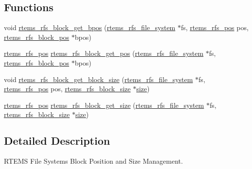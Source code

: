 \subsection*{Functions}
\begin{DoxyCompactItemize}
\item 
void \mbox{\hyperlink{rtems-rfs-block-pos_8h_a35848429d41d99f4aab4be97b41a324e}{rtems\+\_\+rfs\+\_\+block\+\_\+get\+\_\+bpos}} (\mbox{\hyperlink{struct__rtems__rfs__file__system}{rtems\+\_\+rfs\+\_\+file\+\_\+system}} $\ast$fs, \mbox{\hyperlink{rtems-rfs-file-system_8h_ae6adc04fe673c46403605d64f16699bd}{rtems\+\_\+rfs\+\_\+pos}} pos, \mbox{\hyperlink{rtems-rfs-block-pos_8h_a0d8bd7482333e584a03df45e60cda226}{rtems\+\_\+rfs\+\_\+block\+\_\+pos}} $\ast$bpos)
\item 
\mbox{\hyperlink{rtems-rfs-file-system_8h_ae6adc04fe673c46403605d64f16699bd}{rtems\+\_\+rfs\+\_\+pos}} \mbox{\hyperlink{rtems-rfs-block-pos_8h_a76f70461e9f76aa1f6739a13a8f26735}{rtems\+\_\+rfs\+\_\+block\+\_\+get\+\_\+pos}} (\mbox{\hyperlink{struct__rtems__rfs__file__system}{rtems\+\_\+rfs\+\_\+file\+\_\+system}} $\ast$fs, \mbox{\hyperlink{rtems-rfs-block-pos_8h_a0d8bd7482333e584a03df45e60cda226}{rtems\+\_\+rfs\+\_\+block\+\_\+pos}} $\ast$bpos)
\item 
void \mbox{\hyperlink{rtems-rfs-block-pos_8h_a6982a30feb7426e107b0c899b80fbbe6}{rtems\+\_\+rfs\+\_\+block\+\_\+get\+\_\+block\+\_\+size}} (\mbox{\hyperlink{struct__rtems__rfs__file__system}{rtems\+\_\+rfs\+\_\+file\+\_\+system}} $\ast$fs, \mbox{\hyperlink{rtems-rfs-file-system_8h_ae6adc04fe673c46403605d64f16699bd}{rtems\+\_\+rfs\+\_\+pos}} pos, \mbox{\hyperlink{rtems-rfs-block-pos_8h_aa72438eee22908110dc633ca6b89b390}{rtems\+\_\+rfs\+\_\+block\+\_\+size}} $\ast$\mbox{\hyperlink{sun4u_2tte_8h_a245260f6f74972558f61b85227df5aae}{size}})
\item 
\mbox{\hyperlink{rtems-rfs-file-system_8h_ae6adc04fe673c46403605d64f16699bd}{rtems\+\_\+rfs\+\_\+pos}} \mbox{\hyperlink{rtems-rfs-block-pos_8h_a4420107003db9b6d34945a95ab14b520}{rtems\+\_\+rfs\+\_\+block\+\_\+get\+\_\+size}} (\mbox{\hyperlink{struct__rtems__rfs__file__system}{rtems\+\_\+rfs\+\_\+file\+\_\+system}} $\ast$fs, \mbox{\hyperlink{rtems-rfs-block-pos_8h_aa72438eee22908110dc633ca6b89b390}{rtems\+\_\+rfs\+\_\+block\+\_\+size}} $\ast$\mbox{\hyperlink{sun4u_2tte_8h_a245260f6f74972558f61b85227df5aae}{size}})
\end{DoxyCompactItemize}


\subsection{Detailed Description}
R\+T\+E\+MS File Systems Block Position and Size Management. 

